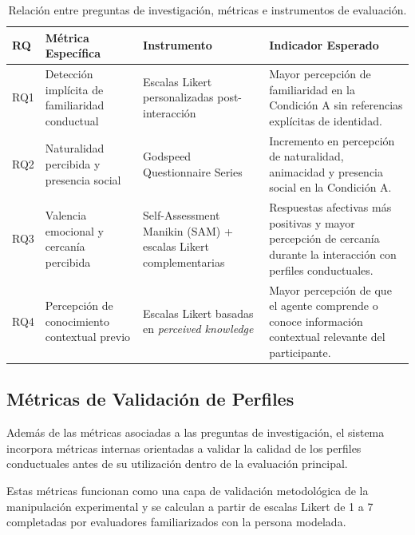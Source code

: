\documentclass[12pt]{article}
\begin{document}
\begin{table}[H]
\centering
\small
\renewcommand{\arraystretch}{1.2}

\begin{tabular}{p{1.5cm} p{4cm} p{4cm} p{4cm}}
\toprule
\textbf{RQ} & \textbf{Métrica Específica} & \textbf{Instrumento} & \textbf{Indicador Esperado} \\
\midrule

RQ1
& Detección implícita de familiaridad conductual
& Escalas Likert personalizadas post-interacción
& Mayor percepción de familiaridad en la Condición A sin referencias explícitas de identidad. \\

RQ2
& Naturalidad percibida y presencia social
& Godspeed Questionnaire Series
& Incremento en percepción de naturalidad, animacidad y presencia social en la Condición A. \\

RQ3
& Valencia emocional y cercanía percibida
& Self-Assessment Manikin (SAM) + escalas Likert complementarias
& Respuestas afectivas más positivas y mayor percepción de cercanía durante la interacción con perfiles conductuales. \\

RQ4
& Percepción de conocimiento contextual previo
& Escalas Likert basadas en \textit{perceived knowledge}
& Mayor percepción de que el agente comprende o conoce información contextual relevante del participante. \\

\bottomrule
\end{tabular}

\caption{Relación entre preguntas de investigación, métricas e instrumentos de evaluación.}

\end{table}

\subsection{Métricas de Validación de Perfiles}

Además de las métricas asociadas a las preguntas de investigación, el sistema incorpora métricas internas orientadas a validar la calidad de los perfiles conductuales antes de su utilización dentro de la evaluación principal.

Estas métricas funcionan como una capa de validación metodológica de la manipulación experimental y se calculan a partir de escalas Likert de 1 a 7 completadas por evaluadores familiarizados con la persona modelada.
\end{document}
